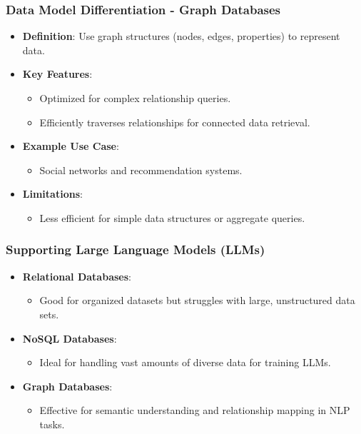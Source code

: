 \documentclass[aspectratio=169]{beamer}
\begin{document}
\begin{frame}[fragile]
    \frametitle{Data Model Differentiation - Graph Databases}
    \begin{itemize}
        \item \textbf{Definition}: Use graph structures (nodes, edges, properties) to represent data.
        \item \textbf{Key Features}:
            \begin{itemize}
                \item Optimized for complex relationship queries.
                \item Efficiently traverses relationships for connected data retrieval.
            \end{itemize}
        \item \textbf{Example Use Case}: 
            \begin{itemize}
                \item Social networks and recommendation systems.
            \end{itemize}
        \item \textbf{Limitations}:
            \begin{itemize}
                \item Less efficient for simple data structures or aggregate queries.
            \end{itemize}
    \end{itemize}
\end{frame}

\begin{frame}[fragile]
    \frametitle{Supporting Large Language Models (LLMs)}
    \begin{itemize}
        \item \textbf{Relational Databases}:
            \begin{itemize}
                \item Good for organized datasets but struggles with large, unstructured data sets.
            \end{itemize}
        \item \textbf{NoSQL Databases}:
            \begin{itemize}
                \item Ideal for handling vast amounts of diverse data for training LLMs.
            \end{itemize}
        \item \textbf{Graph Databases}:
            \begin{itemize}
                \item Effective for semantic understanding and relationship mapping in NLP tasks.
            \end{itemize}
    \end{itemize}
\end{frame}
\end{document}
